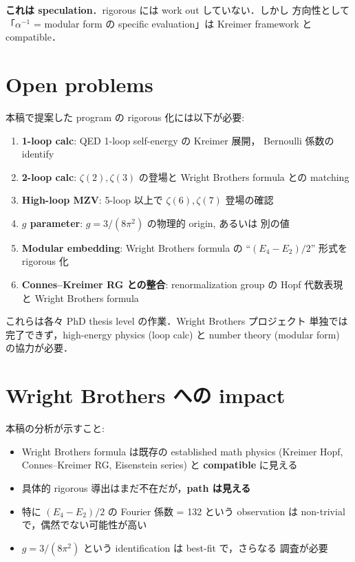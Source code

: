 \documentclass[11pt,a4paper]{article}
\begin{document}
\textbf{これは speculation}．rigorous には work out していない．しかし
方向性として「$\alpha^{-1}$ = modular form の specific evaluation」は
Kreimer framework と compatible．

\section{Open problems}

本稿で提案した program の rigorous 化には以下が必要:

\begin{enumerate}
\item \textbf{1-loop calc}: QED 1-loop self-energy の Kreimer 展開，
Bernoulli 係数の identify
\item \textbf{2-loop calc}: $\zeta(2), \zeta(3)$ の登場と Wright Brothers
formula との matching
\item \textbf{High-loop MZV}: 5-loop 以上で $\zeta(6), \zeta(7)$
登場の確認
\item \textbf{$g$ parameter}: $g = 3/(8\pi^2)$ の物理的 origin, あるいは
別の値
\item \textbf{Modular embedding}: Wright Brothers formula の
``$(E_4 - E_2)/2$'' 形式を rigorous 化
\item \textbf{Connes--Kreimer RG との整合}: renormalization group の
Hopf 代数表現と Wright Brothers formula
\end{enumerate}

これらは各々 PhD thesis level の作業．Wright Brothers プロジェクト
単独では完了できず，high-energy physics (loop calc) と number theory
(modular form) の協力が必要．

\section{Wright Brothers への impact}

本稿の分析が示すこと:

\begin{itemize}
\item Wright Brothers formula は既存の established math physics
(Kreimer Hopf, Connes--Kreimer RG, Eisenstein series) と
\textbf{compatible} に見える
\item 具体的 rigorous 導出はまだ不在だが，\textbf{path は見える}
\item 特に $(E_4 - E_2)/2$ の Fourier 係数 = 132 という observation は
non-trivial で，偶然でない可能性が高い
\item $g = 3/(8\pi^2)$ という identification は best-fit で，さらなる
調査が必要
\end{itemize}
\end{document}
